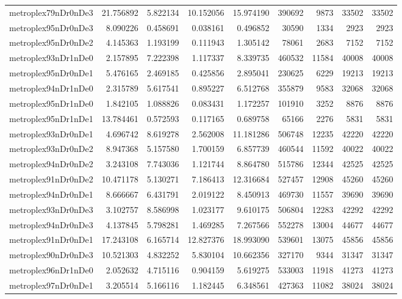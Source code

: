 \begin{longtable}{|l|r|r|r|r|r|r|r|r|}
metroplex79nDr0nDe3 & 21.756892 & 5.822134 & 10.152056 & 15.974190 & 390692 & 9873 & 33502 & 33502 \\
metroplex95nDr0nDe3 & 8.090226 & 0.458691 & 0.038161 & 0.496852 & 30590 & 1334 & 2923 & 2923 \\
metroplex95nDr0nDe2 & 4.145363 & 1.193199 & 0.111943 & 1.305142 & 78061 & 2683 & 7152 & 7152 \\
metroplex93nDr1nDe0 & 2.157895 & 7.222398 & 1.117337 & 8.339735 & 460532 & 11584 & 40008 & 40008 \\
metroplex95nDr0nDe1 & 5.476165 & 2.469185 & 0.425856 & 2.895041 & 230625 & 6229 & 19213 & 19213 \\
metroplex94nDr1nDe0 & 2.315789 & 5.617541 & 0.895227 & 6.512768 & 355879 & 9583 & 32068 & 32068 \\
metroplex95nDr1nDe0 & 1.842105 & 1.088826 & 0.083431 & 1.172257 & 101910 & 3252 & 8876 & 8876 \\
metroplex95nDr1nDe1 & 13.784461 & 0.572593 & 0.117165 & 0.689758 & 65166 & 2276 & 5831 & 5831 \\
metroplex93nDr0nDe1 & 4.696742 & 8.619278 & 2.562008 & 11.181286 & 506748 & 12235 & 42220 & 42220 \\
metroplex93nDr0nDe2 & 8.947368 & 5.157580 & 1.700159 & 6.857739 & 460544 & 11592 & 40022 & 40022 \\
metroplex94nDr0nDe2 & 3.243108 & 7.743036 & 1.121744 & 8.864780 & 515786 & 12344 & 42525 & 42525 \\
metroplex91nDr0nDe2 & 10.471178 & 5.130271 & 7.186413 & 12.316684 & 527457 & 12908 & 45260 & 45260 \\
metroplex94nDr0nDe1 & 8.666667 & 6.431791 & 2.019122 & 8.450913 & 469730 & 11557 & 39690 & 39690 \\
metroplex93nDr0nDe3 & 3.102757 & 8.586998 & 1.023177 & 9.610175 & 506804 & 12283 & 42292 & 42292 \\
metroplex94nDr0nDe3 & 4.137845 & 5.798281 & 1.469285 & 7.267566 & 552278 & 13004 & 44677 & 44677 \\
metroplex91nDr0nDe1 & 17.243108 & 6.165714 & 12.827376 & 18.993090 & 539601 & 13075 & 45856 & 45856 \\
metroplex90nDr0nDe3 & 10.521303 & 4.832252 & 5.830104 & 10.662356 & 327170 & 9344 & 31347 & 31347 \\
metroplex96nDr1nDe0 & 2.052632 & 4.715116 & 0.904159 & 5.619275 & 533003 & 11918 & 41273 & 41273 \\
metroplex97nDr0nDe1 & 3.205514 & 5.166116 & 1.182445 & 6.348561 & 427363 & 11082 & 38024 & 38024 \\

\end{longtable}
